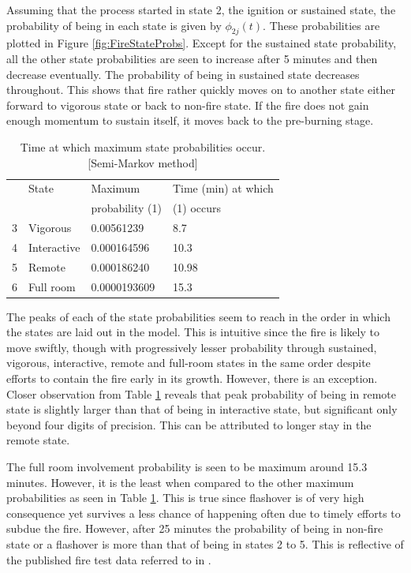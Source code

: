 \documentclass[12pt]{asme2ej}
\begin{document}
Assuming that the process started in state 2, the ignition or sustained state, the probability of being in each state is given by $\phi_{2j}(t)$. These probabilities are plotted in Figure \ref{fig:FireStateProbs}. Except for the sustained state probability, all the other state probabilities are seen to increase after 5 minutes and then decrease eventually. 
The probability of being in sustained state decreases throughout. This shows that fire rather quickly moves on to another state either forward to vigorous state or back to non-fire state.  If the fire does not gain enough momentum to sustain itself, it moves back to the pre-burning stage. 

\begin{table}\centering
\caption{Time at which maximum state probabilities occur. [Semi-Markov method]\label{tbl:FireMaxProbs}}
\begin{tabular}{ l l l l}
	\hline
& State &	Maximum 	& Time (min) at which \\
&		& probability (1)					&				 (1) occurs \\
	\hline
3 & Vigorous &	0.00561239	&	8.7\\
4 & Interactive &  0.000164596	& 10.3\\
5 & Remote &  0.000186240	&	10.98			\\
6 & Full room &  0.0000193609 & 15.3\\
  \hline
\end{tabular}
\end{table}

The peaks of each of the state probabilities seem to reach in the order in which the states are laid out in the model. This is intuitive  since the fire is likely to move swiftly, though with progressively lesser probability through sustained, vigorous, interactive, remote and full-room states in the same order despite efforts to contain the fire early in its growth. However, there is an exception. Closer observation from Table \ref{tbl:FireMaxProbs} reveals that peak probability of being in remote state is slightly larger than that of being in interactive state, but significant only beyond four digits of precision. This can be attributed to longer stay in the remote state.

The full room involvement probability is seen to be maximum around 15.3 minutes. However, it is the least when compared to the other maximum probabilities as seen in Table \ref{tbl:FireMaxProbs}. This is true since flashover is of very high consequence yet survives a less chance of happening often due to timely efforts to subdue the fire. However, after 25 minutes the probability of being in non-fire state or a flashover is more than that of being in states 2 to 5. This is reflective of the published fire test data referred to in \cite{Berlin1985}.
\end{document}
